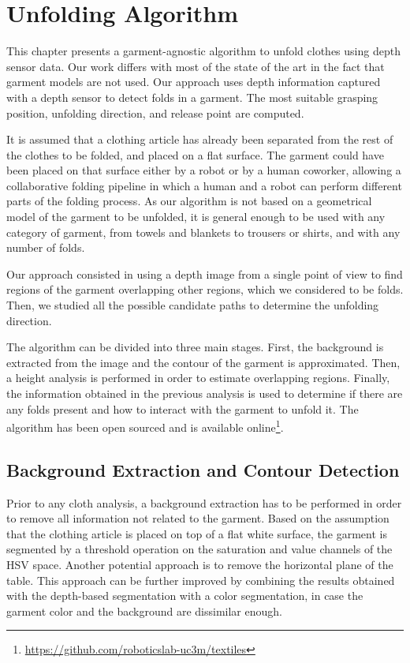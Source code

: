 \chapter{Unfolding Algorithm}
\label{architecture}

This chapter presents a garment-agnostic algorithm to unfold clothes using depth sensor data. Our work differs with most of the state of the art in the fact that garment models are not used. Our approach uses depth information captured with a depth sensor to detect folds in a garment. The most suitable grasping position, unfolding direction, and release point are computed.

It is assumed that a clothing article has already been separated from the rest of the clothes to be folded, and placed on a flat surface. The garment could have been placed on that surface either by a robot or by a human coworker, allowing a collaborative folding pipeline in which a human and a robot can perform different parts of the folding process.
As our algorithm is not based on a geometrical model of the garment to be unfolded, it is general enough to be used with any category of garment, from towels and blankets to trousers or shirts, and with any number of folds. 

Our approach consisted in using a depth image from a single point of view to find regions of the garment overlapping other regions, which we considered to be folds. Then, we studied all the possible candidate paths to determine the unfolding direction. 

The algorithm can be divided into three main stages. First, the background is extracted from the image and the contour of the garment is approximated. Then, a height analysis is performed in order to estimate overlapping regions. Finally, the information obtained in the previous analysis is used to determine if there are any folds present and how to interact with the garment to unfold it. The algorithm has been open sourced and is available online\footnote{\url{https://github.com/roboticslab-uc3m/textiles}}.


\section{Background Extraction and Contour Detection}
Prior to any cloth analysis, a background extraction has to be performed in order to remove all information not related to the garment.
Based on the assumption that the clothing article is placed on top of a flat white surface, the garment is segmented by a threshold operation on the saturation and value channels of the HSV space. Another potential approach is to remove the horizontal plane of the table. This approach can be further improved by combining the results obtained with the depth-based segmentation with a color segmentation, in case the garment color and the background are dissimilar enough.

